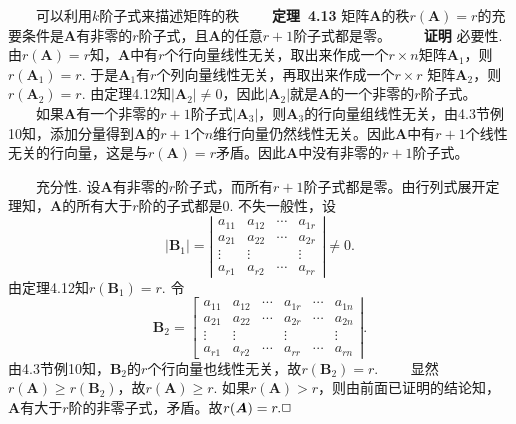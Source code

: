 \documentclass[compress,mathserif,cjk]{beamer}
\theoremstyle{remark}
\numberwithin{equation}{section}
\newcommand{\hei}{\bf}      %
\begin{document}
\begin{CJK}{UTF8}{gbsn}
\begin{frame}
 \ \ \ \ 可以利用$k$阶子式来描述矩阵的秩
 \vskip 5pt
 \ \ \ \ {\hei 定理~4.13} 矩阵$\bm A$的秩$r(\bm A)=r$的充要条件是$\bm A$有非零的$r$阶子式，且$\bm A$的任意$r+1$阶子式都是零。
 \pause\vskip 10pt
 \ \ \ \ {\hei 证明} 必要性. 由$r(\bm A)=r$知，$\bm A$中有$r$个行向量线性无关，取出来作成一个$r\times n$矩阵$\bm A_1$，则$r(\bm A_1)=r$. 于是$\bm A_1$有$r$个列向量线性无关，再取出来作成一个$r\times r$ 矩阵$\bm A_2$，则$r(\bm A_2)=r$. 由定理4.12知$|\bm A_2|\neq0$，因此$|\bm A_2|$就是$\bm A$的一个非零的$r$阶子式。
 \pause\vskip 5pt
 \ \ \ \ 如果$\bm A$有一个非零的$r+1$阶子式$|\bm A_3|$，则$\bm A_3$的行向量组线性无关，由4.3节例10知，添加分量得到$\bm A$的$r+1$个$n$维行向量仍然线性无关。因此$\bm A$中有$r+1$个线性无关的行向量，这是与$r(\bm A)=r$矛盾。因此$\bm A$中没有非零的$r+1$阶子式。

\end{frame}
\begin{frame}\small
 \ \ \ \ 充分性. 设$\bm A$有非零的$r$阶子式，而所有$r+1$阶子式都是零。由行列式展开定理知，$\bm A$的所有大于$r$阶的子式都是0. 不失一般性，设
 $$|\bm B_1|=\left|\begin{matrix}a_{11}&a_{12}&\cdots&a_{1r}\\a_{21}&a_{22}&\cdots&a_{2r}\\ \vdots&\vdots&&\vdots\\a_{r1}&a_{r2}&\cdots&a_{rr}\end{matrix}\right|\neq0.$$
 由定理4.12知$r(\bm B_1)=r$. \pause 令
 $$\bm B_2=\left[\begin{matrix}a_{11}&a_{12}&\cdots&a_{1r}&\cdots&a_{1n}\\a_{21}&a_{22}&\cdots&a_{2r}&\cdots&a_{2n}\\ \vdots&\vdots&&\vdots&&\vdots\\a_{r1}&a_{r2}&\cdots&a_{rr}&\cdots&a_{rn}\end{matrix}\right|.$$
 由4.3节例10知，$\bm B_2$的$r$个行向量也线性无关，故$r(\bm B_2)=r$.
 \pause\vskip 5pt
 \ \ \ \ 显然$r(\bm A)\geq r(\bm B_2)$，故$r(\bm A)\geq r$. 如果$r(\bm A)>r$，则由前面已证明的结论知，$\bm A$有大于$r$阶的非零子式，矛盾。故$r(\bm A)=r.\hfill\Box$
\end{frame}


\end{CJK}
\end{document}
